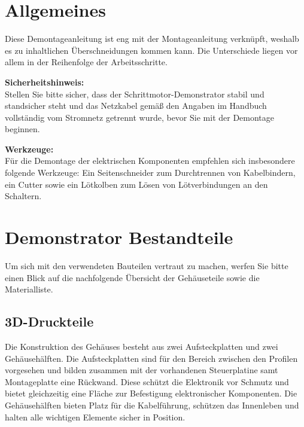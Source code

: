 %
%

\chapter{Allgemeines}

Diese Demontageanleitung ist eng mit der Montageanleitung verknüpft, weshalb es zu inhaltlichen Überschneidungen kommen kann. Die Unterschiede liegen vor allem in der Reihenfolge der Arbeitsschritte.

\vspace{0.5em}
\textbf{Sicherheitshinweis:}\\
Stellen Sie bitte sicher, dass der Schrittmotor-Demonstrator stabil und standsicher steht und das Netzkabel gemäß den Angaben im Handbuch vollständig vom Stromnetz getrennt wurde, bevor Sie mit der Demontage beginnen.

\vspace{0.5em}
\textbf{Werkzeuge:}\\
Für die Demontage der elektrischen Komponenten empfehlen sich insbesondere folgende Werkzeuge: Ein Seitenschneider zum Durchtrennen von Kabelbindern, ein Cutter sowie ein Lötkolben zum Lösen von Lötverbindungen an den Schaltern.



\chapter{Demonstrator Bestandteile}

Um sich mit den verwendeten Bauteilen vertraut zu machen, werfen Sie bitte einen Blick auf die nachfolgende Übersicht der Gehäuseteile sowie die Materialliste.


\section{3D-Druckteile}
Die Konstruktion des Gehäuses besteht aus zwei Aufsteckplatten und zwei Gehäusehälften. Die Aufsteckplatten sind für den Bereich zwischen den Profilen vorgesehen und bilden zusammen mit der vorhandenen Steuerplatine samt Montageplatte eine Rückwand. Diese schützt die Elektronik vor Schmutz und bietet gleichzeitig eine Fläche zur Befestigung elektronischer Komponenten.
Die Gehäusehälften bieten Platz für die Kabelführung, schützen das Innenleben und halten alle wichtigen Elemente sicher in Position.

